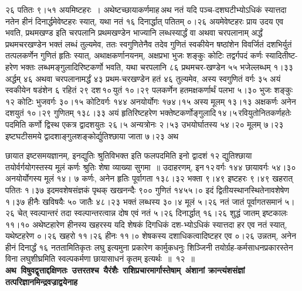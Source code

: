 \documentclass[11pt, openany]{book}
\begin{document}
\noindent २६ पतितः ९।५१ अयमिष्टहरः~। अथेष्टच्छायाकर्णमाह\textendash \,अथ नतं यदि पञ्च-दशघटीभ्योऽधिकं स्यात्तदा नतेन हीनं दिनार्द्धमेवेष्टहरः स्यात्, यथा नतं १६ दिनार्द्धात् पतितम् ०।२६ अयमेवेष्टहरः प्राय उदय एव भवति, प्रथमखण्ड इति चरपलानि प्रथमखण्डेन भाज्यानि लब्धस्यार्द्धं वा अथवा चरपलानाम् अर्द्धं प्रथमचरखण्डेन भक्तं लब्धं तुल्यमेव, ततः स्वगुणितेनैव तदेव गुणितं स्वकीयेन \;षष्ठांशेन \;विवर्जितं \;दशभिर्युतं \;तत्पलकर्णेन \;गुणितं \;हृतिः \;स्यात्, अथाक्षकर्णानयनम्, अक्षप्रभा भुजः शङ्कुः कोटिः तद्वर्गपदं कर्णः स्यादितीष्ट-हरेण भक्तः लब्धमङ्गुलादिरिष्टकर्णो भवति, यथा चरपलानि ८६ प्रथमचर-खण्डेन ५५ भजेल्लब्धम् १।३३ अर्द्धम् ४६ अथवा चरपलानामर्द्धं ४३ प्रथम-चरखण्डेन हतं ४६ तुल्यमेव, अस्य स्वगुणितं वर्गः ३५ अयं स्वकीयेन षडंशेन ६ रहितं २९ दश\textendash \,१०\textendash \,युतं १०।२९ पलकर्णेन हतमक्षकर्णार्थं पलभा ५।३० भुजः शङ्कुः १२ कोटिः भुजवर्गः ३०।१५ कोटिवर्गः १४४ अनयोर्योगः १७४।१५ अस्य मूलम् १३।१३ अक्षकर्णः अनेन दशयुतं १०।२९ गुणितम् १३८।३३ अयं हृतिरिष्टहरेण \;भक्तेष्टकर्णोङ्गुलादि\textendash \,१४।५\textendash \,रवियुतोनितकर्णहतेः \;पदमिति कर्णो द्विस्थ एकत्र द्वादशयुतः २६।५ अन्यत्रोनः २।५३ उभयोर्घातस्य ५४।२० मूलम् ७।२३ इष्टघटीसमये द्वादशाङ्गुलशङ्कोर्द्युतिश्छाया जाता ७।२३ अथ

\newpage

\noindent छायात इष्टसमयज्ञानम्, इनद्युतिः श्रुतिविभक्त इति फलपदमिति इनो द्वादशं १२ द्युतिश्छाया तयोर्वर्गयोगस्तस्य मूलं कर्णः श्रुतिः शेषा व्याख्या सुगमा~॥ उदाहरणम्, इन\textendash \,१२\textendash \,वर्गः १४४ छायावर्गः ५४।३० अनयोर्योगस्य मूलं १४। ७ कर्णः, अनेन हृतिः पूर्वागता १३८।३२ भक्ता ९।४९ इष्टहरः ९।४९ खहरात् पतितः १।३७ इदमवशेषसंज्ञकं पृथक् खखनन्दैः ९०० गुणितं १४५५।० इदं द्वितीयस्थानस्थितेनावशेषेण १।३७ हीनैः खविषयैः ५० जातैः ४८।२३ भक्तं लब्धस्य ३०।४ मूलं ५।२६ नतं जातं पूर्वागतसमानं ५।२६ चेत् स्वल्पान्तरं तदा स्वल्पान्तरत्वान्न दोष एवं नतं ५।२६ दिनार्द्धात् १६।२६ शुद्धं जातम् इष्टकालः ११।१० अथेष्टहारेण हीनस्य खहरस्य यदि शेषकं दिगधिकं दश-भ्योऽधिकं स्यात्तदा हर एव नतं स्यात्, यथेष्टहरेण ०।२६ खहरो ११।२६ हीनः ११।० शेषकस्य दशाधिकत्वादिष्टहर एव ०।२६ उन्नतम्, अनेन हीनं दिनार्द्धं १६ नततामितिकृतः लघु इत्यमुना प्रकारेण कार्मुकधनुः शिञ्जिनी तयोर्ग्रह-कर्मसाधनप्रकारस्तेन विना लघुशीघ्रमिति स्वल्पकर्मणा छायासाधनं कृतम् इत्यर्थः~॥~१२~॥\\

{\small \textbf{अथ \,विषुवद्वृत्ताद्दक्षिणतः \,उत्तरतश्च \,यैरंशैः \,राशिप्रचारमार्गास्तेषाम् \,अंशानां क्रान्त्यंशसंज्ञां तत्परिज्ञानमिन्द्रवज्राद्वयेनाह\textendash }}

\newpage
\end{document}
